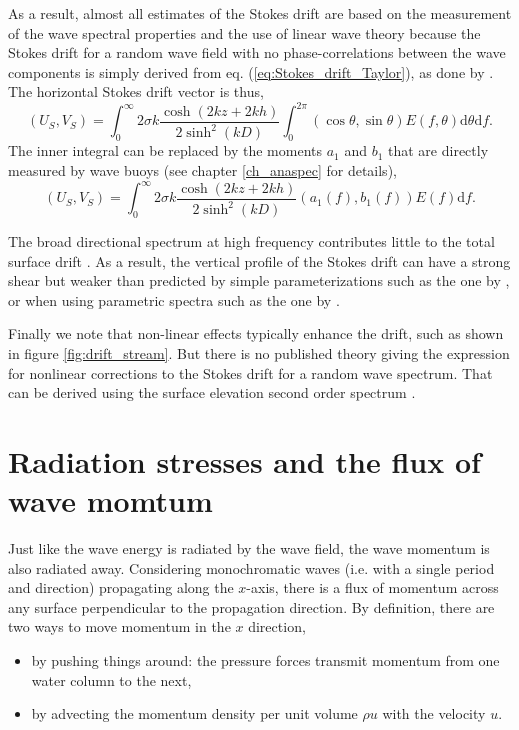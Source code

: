 As a result, almost all estimates of the Stokes drift are based on the measurement of the wave spectral properties and the use of linear wave theory because the Stokes drift for a random wave field with no phase-correlations between the wave components is simply derived from eq. (\ref{eq:Stokes_drift_Taylor}), as done by \cite{Kenyon1969}. The horizontal Stokes drift vector is thus,  
\begin{equation}
 (U_S, V_S) = \int_0^{\infty}  2 \sigma  k  \frac{\cosh(2kz+2kh)}{2\sinh^2(kD)} \int_0^{2 \pi} (\cos \theta,\sin \theta)  E(f,\theta) \mathrm{d}\theta \mathrm{d} f.
\end{equation}
The inner integral can be replaced by the moments $a_1$ and $b_1$ that are directly measured by wave buoys (see chapter \ref{ch_anaspec} for details), 
\begin{equation}
 (U_S, V_S) = \int_0^{\infty}   2 \sigma  k  \frac{\cosh(2kz+2kh)}{2\sinh^2(kD)} (a_1(f),b_1(f))  E(f)  \mathrm{d} f.
\end{equation}

The broad directional spectrum at high frequency contributes little to the total surface drift \citep{Peureux&al.2018}. As a result, the vertical profile of the Stokes drift can have a strong shear but weaker than predicted by simple parameterizations such as the one by \cite{Breivik&al.2016}, or when using parametric spectra such as the one by \cite{Elfouhaily&al.1997}.

Finally we note that non-linear effects typically enhance the drift, such as shown in figure \ref{fig:drift_stream}. But there is no published theory giving the expression for nonlinear corrections to the Stokes drift for a random wave spectrum. That can be derived using the surface elevation second order spectrum \citep{Janssen2009,Leckler&al.2015}.

\section{Radiation stresses and the flux of wave momtum \label{section:Sxx}}
Just like the wave energy is radiated by the wave field, the wave momentum is also radiated away. 
Considering monochromatic waves (i.e. with a single period and direction) propagating 
along the $x$-axis, there is a flux of momentum across any surface perpendicular to the propagation direction. By definition, 
there are two ways to move momentum in the $x$ direction, 
\begin{itemize}
 \item by pushing things around: the pressure forces transmit momentum from one water column to the next,
 \item by advecting the momentum density per unit volume $\rho u$ with the velocity $u$.
\end{itemize}

